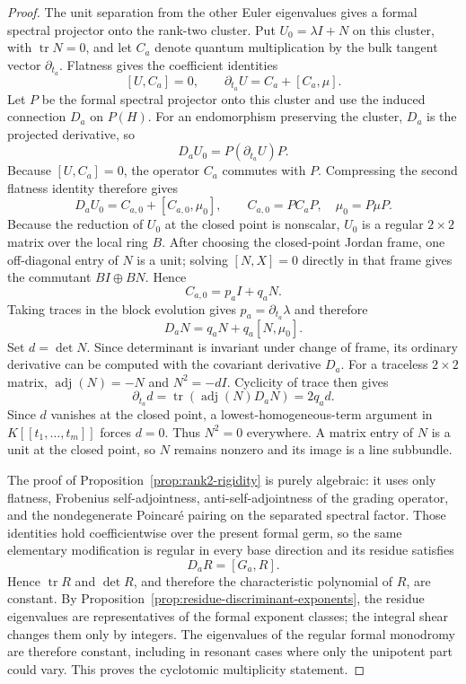 \begin{proof}
The unit separation from the other Euler eigenvalues gives a formal spectral
projector onto the rank-two cluster.  Put
$U_0=\lambda I+N$ on this cluster, with $\operatorname{tr}N=0$, and let
$C_a$ denote quantum multiplication by the bulk tangent vector
$\partial_{t_a}$.  Flatness gives the coefficient identities
\[
 [U,C_a]=0,\qquad
 \partial_{t_a}U=C_a+[C_a,\mu].
\]
Let $P$ be the formal spectral projector onto this cluster and use the
induced connection $D_a$ on $P(H)$.  For an endomorphism preserving the
cluster, $D_a$ is the projected derivative, so
\[
 D_aU_0=P(\partial_{t_a}U)P.
\]
Because $[U,C_a]=0$, the operator $C_a$ commutes with $P$.  Compressing the
second flatness identity therefore gives
\[
 D_aU_0=C_{a,0}+[C_{a,0},\mu_0],
 \qquad C_{a,0}=PC_aP,\quad \mu_0=P\mu P.
\]
Because the reduction of $U_0$ at the closed point is nonscalar, $U_0$ is a
regular $2\times2$ matrix over the local ring $B$.  After choosing the
closed-point Jordan frame, one off-diagonal entry of $N$ is a unit; solving
$[N,X]=0$ directly in that frame gives the commutant $B I\oplus B N$.
Hence
\[
 C_{a,0}=p_aI+q_aN.
\]
Taking traces in the block evolution gives $p_a=\partial_{t_a}\lambda$ and
therefore
\[
 D_aN=q_aN+q_a[N,\mu_0].
\]
Set $d=\det N$.  Since determinant is invariant under change of frame,
its ordinary derivative can be computed with the covariant derivative
$D_a$.  For a traceless $2\times2$ matrix,
$\operatorname{adj}(N)=-N$ and $N^2=-dI$.  Cyclicity of trace then gives
\[
 \partial_{t_a}d
 =\operatorname{tr}(\operatorname{adj}(N)D_aN)
 =2q_a d.
\]
Since $d$ vanishes at the closed point, a lowest-homogeneous-term argument
in $K[[t_1,\ldots,t_m]]$ forces $d=0$.  Thus $N^2=0$ everywhere.  A matrix
entry of $N$ is a unit at the closed point, so $N$ remains nonzero and its
image is a line subbundle.

The proof of Proposition~\ref{prop:rank2-rigidity} is purely algebraic: it
uses only flatness, Frobenius self-adjointness, anti-self-adjointness of the
grading operator, and the nondegenerate Poincar\'e pairing on the separated
spectral factor.  Those identities hold coefficientwise over the present
formal germ, so the same elementary modification is regular in every base
direction and its residue satisfies
\[
 D_aR=[G_a,R].
\]
Hence $\operatorname{tr}R$ and $\det R$, and therefore the characteristic
polynomial of $R$, are constant.  By
Proposition~\ref{prop:residue-discriminant-exponents}, the residue
eigenvalues are representatives of the formal exponent classes; the
integral shear changes them only by integers.  The eigenvalues of the
regular formal monodromy are therefore constant, including in resonant
cases where only the unipotent part could vary.  This proves the cyclotomic
multiplicity statement.
\end{proof}

